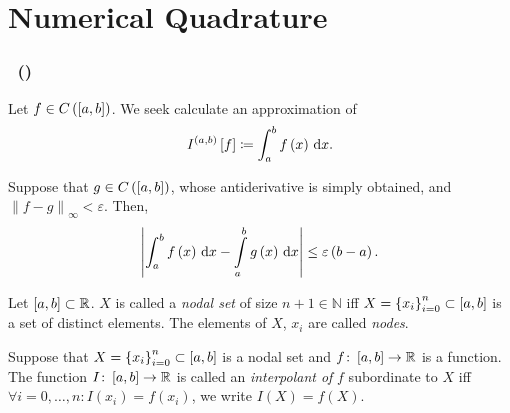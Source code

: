 \section{Numerical Quadrature}

\begin{frame}
	\frametitle{
		\secname~(\citeauthor[p.~397]{salgado_classical_2022})
	} %

	Let
	\begin{math}
		f\in
		C\left(\left[a,b\right]\right)
	\end{math}.
	We seek calculate an approximation of
	\begin{equation*}
		I^{\openinterval}
		\left[
			f
			\right]\coloneqq
		\int_{a}^{b}
		f\left(x\right)
		\dl x.
	\end{equation*}

	Suppose that
	\begin{math}
		g\in
		C\left(\left[a,b\right]\right)
	\end{math},
	whose antiderivative is simply obtained, and
	\begin{math}
		{\left\|f-g\right\|}_{\infty}<
		\varepsilon
	\end{math}.
	Then,
	\begin{equation*}
		\left|
		\int_{a}^{b}
		f\left(x\right)
		\dl x-
		\int\limits_{a}^{b}
		g\left(x\right)
		\dl x
		\right|\leq
		\varepsilon
		\left(b-a\right).
	\end{equation*}

	\begin{definition}
		Let
		\begin{math}
			\left[a,b\right]\subset
			\mathbb{R}
		\end{math}.
		$X$ is called a \emph{nodal set} of size $n+1\in\mathbb{N}$
		iff
		\begin{math}
			X={\left\{x_{i}\right\}}_{i=0}^{n}\subset
			\left[a,b\right]
		\end{math}
		is a set of distinct elements.
		The elements of $X$, $x_{i}$ are called \emph{nodes}.
	\end{definition}

	\begin{definition}
		Suppose that
		\begin{math}
			X={\left\{x_{i}\right\}}_{i=0}^{n}\subset
			\left[a,b\right]
		\end{math}
		is a nodal set and
		\begin{math}
			f\colon
			\left[a,b\right]\to
			\mathbb{R}
		\end{math}
		is a function.
		The function
		\begin{math}
			I\colon
			\left[a,b\right]\to
			\mathbb{R}
		\end{math}
		is called an \emph{interpolant of} $f$ subordinate to $X$ iff
		\begin{math}
			\forall i=0,\dotsc,n:
			I\left(x_{i}\right)=
			f\left(x_{i}\right)
		\end{math},
		we write
		\begin{math}
			I\left(X\right)=
			f\left(X\right)
		\end{math}.
	\end{definition}
\end{frame}


